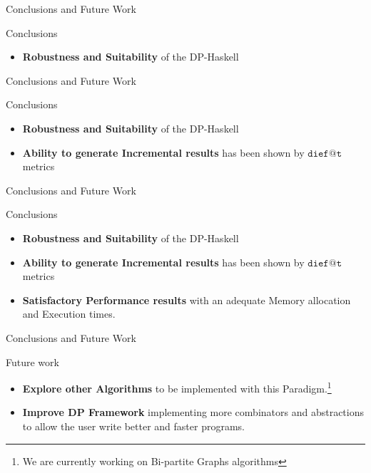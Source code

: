 \begin{frame}[fragile]{Conclusions and Future Work}
  \begin{block}{Conclusions}      
    \begin{itemize}
      \item \textbf{Robustness and Suitability} of the DP-Haskell 
    \end{itemize}
  \end{block}
\end{frame}

\begin{frame}[fragile]{Conclusions and Future Work}
  \begin{block}{Conclusions}      

  \begin{itemize}
    \item \textbf{Robustness and Suitability} of the DP-Haskell 
    \item \textbf{Ability to generate Incremental results} has been shown by $\mathtt{dief@t}$ metrics 
  \end{itemize}
\end{block}
\end{frame}

\begin{frame}[fragile]{Conclusions and Future Work}
  \begin{block}{Conclusions}      

  \begin{itemize}
    \item \textbf{Robustness and Suitability} of the DP-Haskell 
    \item \textbf{Ability to generate Incremental results} has been shown by $\mathtt{dief@t}$ metrics
    \item \textbf{Satisfactory Performance results} with an adequate Memory allocation and Execution times. 
  \end{itemize}
\end{block}
\end{frame}

\begin{frame}[fragile]{Conclusions and Future Work}
  \begin{block}{Future work}      
  \begin{itemize}
    \item \textbf{Explore other Algorithms} to be implemented with this Paradigm.\footnote{We are currently working on Bi-partite Graphs algorithms}
    \item \textbf{Improve DP Framework} implementing more combinators and abstractions to allow the user write better and faster programs.
  \end{itemize}
\end{block}
\end{frame}
